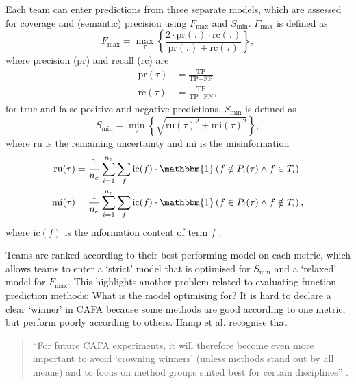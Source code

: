 Each team can enter predictions from three separate models, which are assessed for coverage and (semantic) precision using $F_{\max}$ and $S_{\min}$.
$F_{\max}$ is defined as
\begin{equation}
    F_{\max} = \max_{\tau} \left\{ \frac{2 \cdot \text{pr}(\tau) \cdot \text{rc}(\tau)}{\text{pr}(\tau) + \text{rc}(\tau)} \right\},
    \label{eqn:Fmax}
\end{equation}
where precision (pr) and recall (rc) are
\begin{align*}
    \text{pr}(\tau) &= \frac{\text{TP}}{\text{TP} + \text{FP}} \\
    \text{rc}(\tau) &= \frac{\text{TP}}{\text{TP} + \text{FN}},
\end{align*}
for true and false positive and negative predictions.
$S_{\min}$ is defined as
\begin{equation}
    S_{\min} = \min_{\tau}\left\{ \sqrt{\text{ru}(\tau)^{2} + \text{mi}(\tau)^{2}} \right\},
    \label{eqn:Smin}
\end{equation}
where $\text{ru}$ is the remaining uncertainty and $\text{mi}$ is the misinformation
\begin{align*}
    \text{ru}(\tau) &= \frac{1}{n_{e}}\sum\limits_{i=1}^{n_{e}} \sum\limits_{f} \text{ic}(f) \cdot \mathbbm{1}\left(f \notin P_{i}(\tau) \wedge f \in T_{i} \right)\\
    \text{mi}(\tau) &= \frac{1}{n_{e}}\sum\limits_{i=1}^{n_{e}} \sum\limits_{f} \text{ic}(f) \cdot \mathbbm{1}\left(f \in P_{i}(\tau) \wedge f \notin T_{i} \right),
\end{align*}
where $\text{ic}(f)$ is the information content of term $f$ \cite{Jiang2016}.

Teams are ranked according to their best performing model on each metric, which allows teams to enter a `strict' model that is optimised for $S_{\min}$ and a `relaxed' model for $F_{\max}$. This highlights another problem related to evaluating function prediction methods: What is the model optimising for? It is hard to declare a clear `winner' in CAFA because some methods are good according to one metric, but perform poorly according to others. Hamp et al. recognise that

\begin{quote}
``For future CAFA experiments, it will therefore become even more important to avoid `crowning winners' (unless methods stand out by all means) and to focus on method groups suited best for certain disciplines'' \cite{Hamp2013}.
\end{quote}

